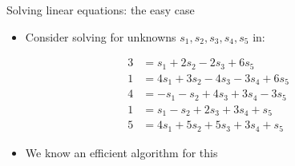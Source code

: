 \documentclass[aspectratio=169, lualatex, handout]{beamer}
\begin{document}
\begin{frame}{Solving linear equations: the easy case}
	\begin{itemize}
		\item Consider solving for unknowns $s_1, s_2, s_3, s_4, s_5$ in:
	\end{itemize}
	\begin{align*}
		3 & = s_1 + 2s_2 - 2s_3 + 6s_5         \\
		1 & = 4s_1 + 3s_2 - 4s_3 - 3s_4 + 6s_5 \\
		4 & = -s_1 - s_2 + 4s_3 + 3s_4 - 3s_5  \\
		1 & = s_1 - s_2 + 2s_3 + 3s_4 + s_5    \\
		5 & = 4s_1 + 5s_2 + 5s_3 + 3s_4 + s_5
	\end{align*}
	\begin{itemize}
		\item We know an efficient algorithm for this
	\end{itemize}
\end{frame}
\end{document}
